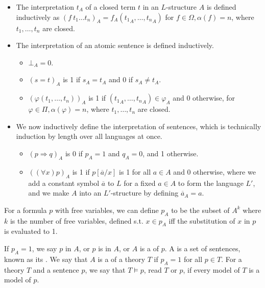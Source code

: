 \begin{itemize}
    \item The interpretation $t_A$ of a closed term $t$ in an $L$-structure $A$ is defined inductively as $(f\ t_1\dots t_n)_A = f_A({t_1}_A, \dots, {t_n}_A)$ for $f \in \Omega, \alpha(f) = n$, where $t_1, \dots, t_n$ are closed.
    \item The interpretation of an atomic sentence is defined inductively.
    \begin{itemize}
            \item $\bot_A = 0$.
        \item $(s = t)_A$ is 1 if $s_A = t_A$ and 0 if $s_A \neq t_A$.
        \item $(\varphi(t_1, \dots, t_n))_A$ is 1 if $({t_1}_A, \dots, {t_n}_A) \in \varphi_A$ and 0 otherwise, for $\varphi \in \Pi, \alpha(\varphi) = n$, where $t_1, \dots, t_n$ are closed.
    \end{itemize}
    \item We now inductively define the interpretation of sentences, which is technically induction by length over all languages at once.
    \begin{itemize}
        \item $(p \Rightarrow q)_A$ is 0 if $p_A = 1$ and $q_A = 0$, and 1 otherwise.
        \item $((\forall x)p)_A$ is 1 if $p[\overline a/x]$ is 1 for all $a \in A$ and 0 otherwise, where we add a constant symbol $\overline a$ to $L$ for a fixed $a \in A$ to form the language $L'$, and we make $A$ into an $L'$-structure by defining $\overline a_A = a$.
    \end{itemize}
\end{itemize}
\begin{remark}
    For a formula $p$ with free variables, we can define $p_A$ to be the subset of $A^k$ where $k$ is the number of free variables, defined s.t. $x \in p_A$ iff the substitution of $x$ in $p$ is evaluated to 1.
\end{remark}
\begin{definition}
    If $p_A = 1$, we say $p$  in $A$, or $p$ is  in $A$, or $A$ is a  of $p$.
    A  is a set of sentences, known as its .
    We say that $A$ is a  of a theory $T$ if $p_A = 1$ for all $p \in T$.
    For a theory $T$ and a sentence $p$, we say that $T \models p$, read $T$  or  $p$, if every model of $T$ is a model of $p$.
\end{definition}

